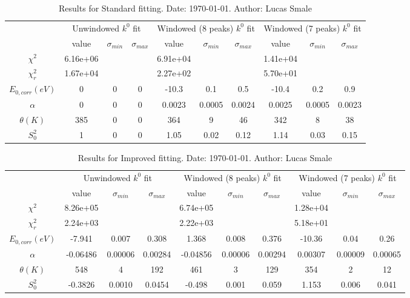 \documentclass{article}
\begin{document}
\begin{landscape}
\begin{table}[ht]
\centering
\begin{tabular}{c||c|c|c||c|c|c||c|c|c}
\hline
&\multicolumn{3}{|c}{Unwindowed $k^{0}$ fit}&\multicolumn{3}{|c}{Windowed (8 peaks) $k^{0}$ fit}&\multicolumn{3}{|c}{Windowed (7 peaks) $k^{0}$ fit}\\
& value & $\sigma_{min}$ & $\sigma_{max}$& value & $\sigma_{min}$ & $\sigma_{max}$& value & $\sigma_{min}$ & $\sigma_{max}$\\
\hline
$\chi^2$   & 6.16e+06 & & & 6.91e+04 & & & 1.41e+04 & & \\
$\chi^2_r$ & 1.67e+04 & & & 2.27e+02 & & & 5.70e+01 & & \\
\hline
$E_{0,corr} (eV)$& 0 & 0 & 0 & -10.3 & 0.1 & 0.5 & -10.4 & 0.2 & 0.9 \\
$\alpha $       & 0 & 0 & 0 & 0.0023 & 0.0005 & 0.0024 & 0.0025 & 0.0005 & 0.0023 \\
$\theta (K) $   & 385 & 0 & 0 & 364 & 9 & 46 & 342 & 8 & 38 \\
$S^2_{0}$& 1 & 0 & 0 & 1.05 & 0.02 & 0.12 & 1.14 & 0.03 & 0.15 \\
\hline
\end{tabular}
 \caption{Results for Standard fitting. Date: \today. Author: Lucas Smale}
\end{table}
\begin{table}[ht]
\centering
\begin{tabular}{c||c|c|c||c|c|c||c|c|c}
\hline
&\multicolumn{3}{|c}{Unwindowed $k^{0}$ fit}&\multicolumn{3}{|c}{Windowed (8 peaks) $k^{0}$ fit}&\multicolumn{3}{|c}{Windowed (7 peaks) $k^{0}$ fit}\\
& value & $\sigma_{min}$ & $\sigma_{max}$& value & $\sigma_{min}$ & $\sigma_{max}$& value & $\sigma_{min}$ & $\sigma_{max}$\\
\hline
$\chi^2$   & 8.26e+05 & & & 6.74e+05 & & & 1.28e+04 & & \\
$\chi^2_r$ & 2.24e+03 & & & 2.22e+03 & & & 5.18e+01 & & \\
\hline
$E_{0,corr} (eV)$& -7.941 & 0.007 & 0.308 & 1.368 & 0.008 & 0.376 & -10.36 & 0.04 & 0.26 \\
$\alpha $       & -0.06486 & 0.00006 & 0.00284 & -0.04856 & 0.00006 & 0.00294 & 0.00307 & 0.00009 & 0.00065 \\
$\theta (K) $   & 548 & 4 & 192 & 461 & 3 & 129 & 354 & 2 & 12 \\
$S^2_{0}$& -0.3826 & 0.0010 & 0.0454 & -0.498 & 0.001 & 0.059 & 1.153 & 0.006 & 0.041 \\
\hline
\end{tabular}
 \caption{Results for Improved fitting. Date: \today. Author: Lucas Smale}
\end{table}
\end{landscape}
\end{document}
